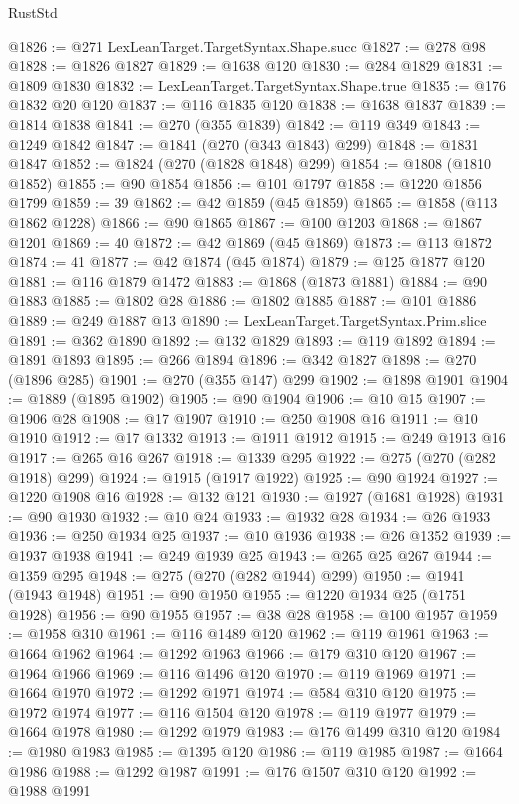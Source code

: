 \begin{lexlean}{RustStd}
\begin{coremodule}
@1826 := @271 LexLeanTarget.TargetSyntax.Shape.succ
@1827 := @278 @98
@1828 := @1826 @1827
@1829 := @1638 @120
@1830 := @284 @1829
@1831 := @1809 @1830
@1832 := LexLeanTarget.TargetSyntax.Shape.true
@1835 := @176 @1832 @20 @120
@1837 := @116 @1835 @120
@1838 := @1638 @1837
@1839 := @1814 @1838
@1841 := @270 (@355 @1839)
@1842 := @119 @349
@1843 := @1249 @1842
@1847 := @1841 (@270 (@343 @1843) @299)
@1848 := @1831 @1847
@1852 := @1824 (@270 (@1828 @1848) @299)
@1854 := @1808 (@1810 @1852)
@1855 := @90 @1854
@1856 := @101 @1797
@1858 := @1220 @1856 @1799
@1859 := 39
@1862 := @42 @1859 (@45 @1859)
@1865 := @1858 (@113 @1862 @1228)
@1866 := @90 @1865
@1867 := @100 @1203
@1868 := @1867 @1201
@1869 := 40
@1872 := @42 @1869 (@45 @1869)
@1873 := @113 @1872
@1874 := 41
@1877 := @42 @1874 (@45 @1874)
@1879 := @125 @1877 @120
@1881 := @116 @1879 @1472
@1883 := @1868 (@1873 @1881)
@1884 := @90 @1883
@1885 := @1802 @28
@1886 := @1802 @1885
@1887 := @101 @1886
@1889 := @249 @1887 @13
@1890 := LexLeanTarget.TargetSyntax.Prim.slice
@1891 := @362 @1890
@1892 := @132 @1829
@1893 := @119 @1892
@1894 := @1891 @1893
@1895 := @266 @1894
@1896 := @342 @1827
@1898 := @270 (@1896 @285)
@1901 := @270 (@355 @147) @299
@1902 := @1898 @1901
@1904 := @1889 (@1895 @1902)
@1905 := @90 @1904
@1906 := @10 @15
@1907 := @1906 @28
@1908 := @17 @1907
@1910 := @250 @1908 @16
@1911 := @10 @1910
@1912 := @17 @1332
@1913 := @1911 @1912
@1915 := @249 @1913 @16
@1917 := @265 @16 @267
@1918 := @1339 @295
@1922 := @275 (@270 (@282 @1918) @299)
@1924 := @1915 (@1917 @1922)
@1925 := @90 @1924
@1927 := @1220 @1908 @16
@1928 := @132 @121
@1930 := @1927 (@1681 @1928)
@1931 := @90 @1930
@1932 := @10 @24
@1933 := @1932 @28
@1934 := @26 @1933
@1936 := @250 @1934 @25
@1937 := @10 @1936
@1938 := @26 @1352
@1939 := @1937 @1938
@1941 := @249 @1939 @25
@1943 := @265 @25 @267
@1944 := @1359 @295
@1948 := @275 (@270 (@282 @1944) @299)
@1950 := @1941 (@1943 @1948)
@1951 := @90 @1950
@1955 := @1220 @1934 @25 (@1751 @1928)
@1956 := @90 @1955
@1957 := @38 @28
@1958 := @100 @1957
@1959 := @1958 @310
@1961 := @116 @1489 @120
@1962 := @119 @1961
@1963 := @1664 @1962
@1964 := @1292 @1963
@1966 := @179 @310 @120
@1967 := @1964 @1966
@1969 := @116 @1496 @120
@1970 := @119 @1969
@1971 := @1664 @1970
@1972 := @1292 @1971
@1974 := @584 @310 @120
@1975 := @1972 @1974
@1977 := @116 @1504 @120
@1978 := @119 @1977
@1979 := @1664 @1978
@1980 := @1292 @1979
@1983 := @176 @1499 @310 @120
@1984 := @1980 @1983
@1985 := @1395 @120
@1986 := @119 @1985
@1987 := @1664 @1986
@1988 := @1292 @1987
@1991 := @176 @1507 @310 @120
@1992 := @1988 @1991

\end{coremodule}
\end{lexlean}
